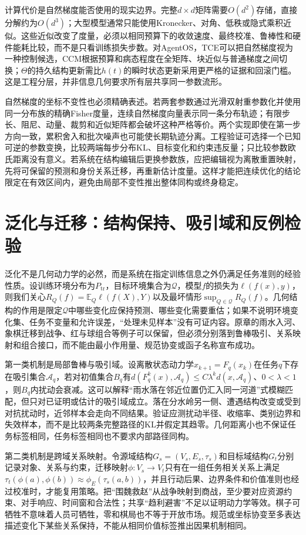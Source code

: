计算代价是自然梯度能否使用的现实边界。完整$d\times d$矩阵需要$O(d^2)$存储，直接分解约为$O(d^3)$；大型模型通常只能使用Kronecker、对角、低秩或隐式乘积近似。这些近似改变了度量，必须以相同预算下的收敛速度、最终校准、鲁棒性和硬件能耗比较，而不是只看训练损失步数。对AgentOS，TCE可以把自然梯度视为一种控制候选，CCM根据预算和病态程度在全矩阵、块近似与普通梯度之间切换；$\Theta$的持久结构更新需比$h(t)$的瞬时状态更新采用更严格的证据和回滚门槛。这是工程分层，并非信息几何要求所有层共享同一参数流形。

自然梯度的坐标不变性也必须精确表述。若两套参数通过光滑双射重参数化并使用同一分布族的精确Fisher度量，连续自然梯度向量表示同一条分布轨迹；有限步长、阻尼、动量、裁剪和近似矩阵都会破坏这种严格等价。两个实现即使在第一步方向一致，累积舍入和批次噪声也可能使长期轨迹分离。工程验证可选择一个已知可逆的参数变换，比较两端每步分布KL、目标变化和约束违反量；只比较参数欧氏距离没有意义。若系统在结构编辑后更换参数族，应把编辑视为离散重置映射，先将可保留的预测和身份关系迁移，再重新估计度量。这样才能把连续优化的结论限定在有效区间内，避免由局部不变性推出整体同构或终身稳定。

\section{泛化与迁移：结构保持、吸引域和反例检验}
\label{sec:geometric_generalization_physics}

泛化不是几何动力学的必然，而是系统在指定训练信息之外仍满足任务准则的经验性质。设训练环境分布为$P_{\mathrm{tr}}$，目标环境集合为$\mathcal Q$，模型$f$的损失为$\ell(f(x),y)$，则我们关心$R_Q(f)=\mathbb E_Q\ell(f(X),Y)$以及最坏情形$\sup_{Q\in\mathcal Q}R_Q(f)$。几何结构的作用是限定$\mathcal Q$中哪些变化应保持预测、哪些变化需要重估；如果不说明环境变化集、任务不变量和允许误差，“处理未见样本”没有可证内容。原章的雨水入河、象棋迁移到战争、红与球组合等例子可以保留，但必须分别落到鲁棒吸引、关系映射和组合接口，而不能由最小作用量、规范协变或函子名称宣布成功。

第一类机制是局部鲁棒与吸引域。设离散状态动力学$x_{k+1}=F_q(x_k)$在任务$q$下存在吸引集合$\mathcal A_q$，若对初值集合$B_q$有$d(F_q^k(x),\mathcal A_q)\leq C\lambda^kd(x,\mathcal A_q)$、$0<\lambda<1$，则$B_q$内扰动会衰减。这可以解释“雨水落在邻近位置仍汇入同一河道”式模糊匹配，但只对已证明或估计的吸引域成立。落在分水岭另一侧、遭遇结构改变或受到对抗扰动时，近邻样本会走向不同结果。验证应测扰动半径、收缩率、类别边界和失效样本，而不是比较两条完整路径的KL并假定其趋零。几何距离小也不保证任务标签相同，任务标签相同也不要求内部路径同构。

第二类机制是跨域关系映射。令源域结构$G_s=(V_s,E_s,\tau_s)$和目标域结构$G_t$分别记录对象、关系与约束，迁移映射$\phi:V_s\to V_t$只有在一组任务相关关系上满足$\tau_t(\phi(a),\phi(b))\approx\phi_E(\tau_s(a,b))$，并且行动后果、边界条件和价值准则也经过校准时，才能复用策略。把“围魏救赵”从战争映射到商战，至少要对应资源约束、对手响应、时间窗和合法性；共享“趋利避害”不足以证明动力学等效。棋子可牺牲不意味着人员可牺牲，零和棋局也不等于开放市场。规范或坐标协变至多表达描述变化下某些关系保持，不能从相同价值标签推出因果机制相同。

